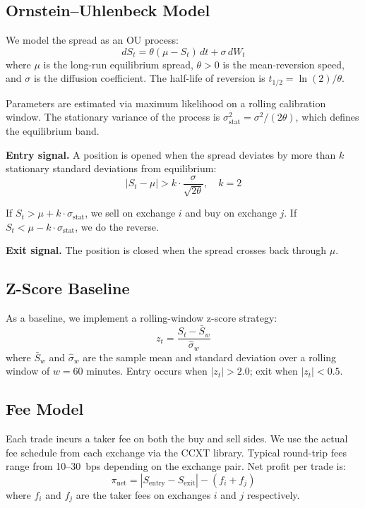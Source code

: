 \documentclass[sigconf,nonacm=false]{acmart}
\begin{document}
\subsection{Ornstein--Uhlenbeck Model}\label{sec:ou}

We model the spread as an OU process:
\begin{equation}\label{eq:ou}
    dS_t = \theta(\mu - S_t)\, dt + \sigma\, dW_t
\end{equation}
where $\mu$ is the long-run equilibrium spread, $\theta > 0$ is the mean-reversion speed, and $\sigma$ is the diffusion coefficient. The half-life of reversion is $t_{1/2} = \ln(2) / \theta$.

Parameters are estimated via maximum likelihood on a rolling calibration window. The stationary variance of the process is $\sigma^2_{\text{stat}} = \sigma^2 / (2\theta)$, which defines the equilibrium band.

\textbf{Entry signal.} A position is opened when the spread deviates by more than $k$ stationary standard deviations from equilibrium:
\begin{equation}
    |S_t - \mu| > k \cdot \frac{\sigma}{\sqrt{2\theta}}, \quad k = 2
\end{equation}

If $S_t > \mu + k \cdot \sigma_{\text{stat}}$, we sell on exchange $i$ and buy on exchange $j$. If $S_t < \mu - k \cdot \sigma_{\text{stat}}$, we do the reverse.

\textbf{Exit signal.} The position is closed when the spread crosses back through $\mu$.

\subsection{Z-Score Baseline}\label{sec:zscore}

As a baseline, we implement a rolling-window z-score strategy:
\begin{equation}
    z_t = \frac{S_t - \bar{S}_w}{\hat{\sigma}_w}
\end{equation}
where $\bar{S}_w$ and $\hat{\sigma}_w$ are the sample mean and standard deviation over a rolling window of $w = 60$ minutes. Entry occurs when $|z_t| > 2.0$; exit when $|z_t| < 0.5$.

\subsection{Fee Model}\label{sec:fees}

Each trade incurs a taker fee on both the buy and sell sides. We use the actual fee schedule from each exchange via the CCXT library. Typical round-trip fees range from 10--30~bps depending on the exchange pair. Net profit per trade is:
\begin{equation}
    \pi_{\text{net}} = |S_{\text{entry}} - S_{\text{exit}}| - (f_i + f_j)
\end{equation}
where $f_i$ and $f_j$ are the taker fees on exchanges $i$ and $j$ respectively.
\end{document}
